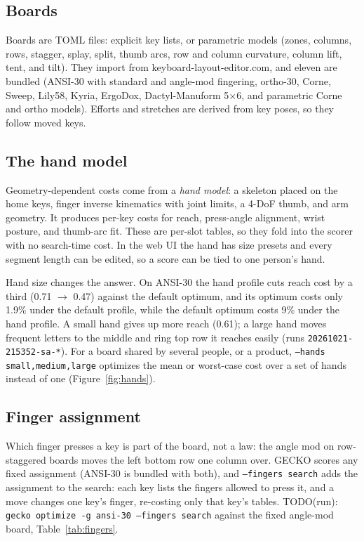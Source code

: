 \documentclass{gecko-paper}
\begin{document}
\begin{paperbody}
\subsection{Boards}
Boards are TOML files: explicit key lists, or parametric models (zones, columns, rows, stagger, splay, split, thumb arcs, row and column curvature, column lift, tent, and tilt). They import from keyboard-layout-editor.com, and eleven are bundled (ANSI-30 with standard and angle-mod fingering, ortho-30, Corne, Sweep, Lily58, Kyria, ErgoDox, Dactyl-Manuform 5$\times$6, and parametric Corne and ortho models). Efforts and stretches are derived from key poses, so they follow moved keys.

\subsection{The hand model}
Geometry-dependent costs come from a \emph{hand model}: a skeleton placed on the home keys, finger inverse kinematics with joint limits, a 4-DoF thumb, and arm geometry. It produces per-key costs for reach, press-angle alignment, wrist posture, and thumb-arc fit. These are per-slot tables, so they fold into the scorer with no search-time cost. In the web UI the hand has size presets and every segment length can be edited, so a score can be tied to one person's hand.

Hand size changes the answer. On ANSI-30 the hand profile cuts reach cost by a third (0.71 $\to$ 0.47) against the default optimum, and its optimum costs only 1.9\% under the default profile, while the default optimum costs 9\% under the hand profile. A small hand gives up more reach (0.61); a large hand moves frequent letters to the middle and ring top row it reaches easily (runs \texttt{20261021-215352-sa-*}). For a board shared by several people, or a product, \texttt{--hands small,medium,large} optimizes the mean or worst-case cost over a set of hands instead of one (Figure~\ref{fig:hands}).


\subsection{Finger assignment}
Which finger presses a key is part of the board, not a law: the angle mod on row-staggered boards moves the left bottom row one column over. GECKO scores any fixed assignment (ANSI-30 is bundled with both), and \texttt{--fingers search} adds the assignment to the search: each key lists the fingers allowed to press it, and a move changes one key's finger, re-costing only that key's tables. TODO(run): \texttt{gecko optimize -g ansi-30 --fingers search} against the fixed angle-mod board, Table~\ref{tab:fingers}.


\end{paperbody}
\end{document}
